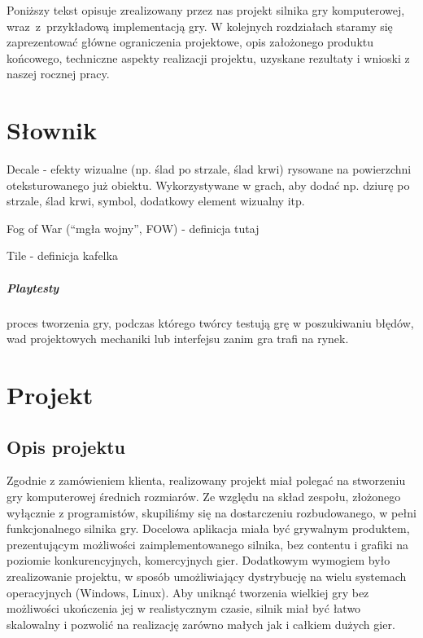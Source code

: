 \documentclass[licencjacka]{pracamgr}
\begin{document}
Poniższy tekst opisuje zrealizowany przez nas projekt silnika gry komputerowej, wraz~z~przykładową implementacją gry. W kolejnych
rozdziałach staramy się zaprezentować główne ograniczenia projektowe, opis założonego produktu końcowego,
techniczne aspekty realizacji projektu, uzyskane rezultaty i wnioski z naszej rocznej pracy.


\chapter{Słownik}
  Decale - efekty wizualne (np. ślad po strzale, ślad krwi) rysowane na powierzchni oteksturowanego już obiektu.
  Wykorzystywane w grach, aby dodać np. dziurę po strzale, ślad krwi, symbol, dodatkowy element wizualny itp.

  Fog of War (``mgła wojny'', FOW) - definicja tutaj

  Tile - definicja kafelka
  
  \paragraph{Playtesty} proces tworzenia gry, podczas którego twórcy testują grę w poszukiwaniu błędów,
  wad projektowych mechaniki lub interfejsu zanim gra trafi na rynek.

\chapter{Projekt}

  \section{Opis projektu}
  Zgodnie z zamówieniem klienta, realizowany projekt miał polegać na stworzeniu gry komputerowej
  średnich rozmiarów. Ze względu na skład zespołu, złożonego wyłącznie z programistów, skupiliśmy się
  na dostarczeniu rozbudowanego, w pełni funkcjonalnego silnika gry.
  Docelowa aplikacja miała być grywalnym produktem, prezentującym możliwości zaimplementowanego silnika,
  bez contentu i grafiki na poziomie konkurencyjnych, komercyjnych gier. Dodatkowym wymogiem było zrealizowanie
  projektu, w sposób umożliwiający dystrybucję na wielu systemach operacyjnych (Windows, Linux). Aby uniknąć
  tworzenia wielkiej gry bez możliwości ukończenia jej w realistycznym czasie, silnik miał być łatwo skalowalny
  i pozwolić na realizację zarówno małych jak i całkiem dużych gier.
\end{document}
